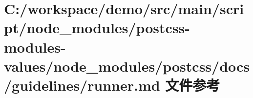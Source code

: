 \hypertarget{postcss-modules-values_2node__modules_2postcss_2docs_2guidelines_2runner_8md}{}\section{C\+:/workspace/demo/src/main/script/node\+\_\+modules/postcss-\/modules-\/values/node\+\_\+modules/postcss/docs/guidelines/runner.md 文件参考}
\label{postcss-modules-values_2node__modules_2postcss_2docs_2guidelines_2runner_8md}
